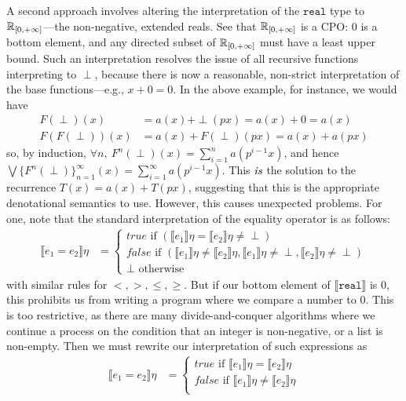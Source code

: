 A second approach involves altering the interpretation of the $\texttt{real}$ type to 
$\mathbb{R}_{[0,+\infty]}$---the non-negative, extended reals. See that $\mathbb{R}_{[0,+\infty]}$ is a CPO: $0$ is a bottom element,
and any directed subset of $\mathbb{R}_{[0,+\infty]}$ must have a least upper bound. Such an interpretation
resolves the issue of all recursive functions interpreting to $\perp$, because there is now a reasonable, non-strict
interpretation of the base functions---e.g., $x + 0 = 0$. In the above example, for instance, we would have
\begin{align*}
F(\perp)(x) &= a(x) + \perp(px) = a(x) + 0 = a(x) \\
F(F(\perp))(x) &= a(x) + F(\perp)(px) = a(x) + a(px)
\end{align*}
so, by induction, 
$\forall n, \ F^n(\perp)(x) = \sum_{i=1}^{n}a(p^{i-1}x)$, and hence $\bigvee\{F^n(\perp)\}^{\infty}_{n=1}(x) = \sum_{i=1}
^{\infty}a(p^{i-1}x)$. This $\emph{is}$ the solution to the recurrence $T(x) = a(x) + T(px)$, suggesting that this is the 
appropriate denotational semantics to use. However, this causes unexpected problems. For one, note that
 the standard interpretation of the equality operator is as follows:
\begin{align*}
 \llbracket e_1 = e_2 \rrbracket\eta &= 
 \begin{cases} 
      true \text{ if } (\llbracket e_1 \rrbracket\eta = \llbracket e_2 \rrbracket\eta \neq \perp) \\
      false \text{  if } (\llbracket e_1 \rrbracket\eta \neq \llbracket e_2\rrbracket\eta, \llbracket e_1 \rrbracket\eta \neq \perp, \llbracket e_2 \rrbracket\eta \neq \perp)\\
      \perp \text{ otherwise}
   \end{cases} 
\end{align*}
with similar rules for $<, >, \leq, \geq$. But if our bottom element of $\llbracket \texttt{real} \rrbracket$ is $0$, this 
prohibits us from writing a program where we compare a number to $0$. This is too restrictive, as there are many 
divide-and-conquer algorithms where we continue a process on the condition that an integer is non-negative, or a 
list is non-empty. Then we must rewrite our interpretation of such expressions as
\begin{align*}
 \llbracket e_1 = e_2 \rrbracket\eta &= 
 \begin{cases} 
      true \text{ if } \llbracket e_1 \rrbracket\eta = \llbracket e_2 \rrbracket\eta \\
      false \text{  if } \llbracket e_1 \rrbracket\eta \neq \llbracket e_2\rrbracket\eta\\
   \end{cases} 
\end{align*}

